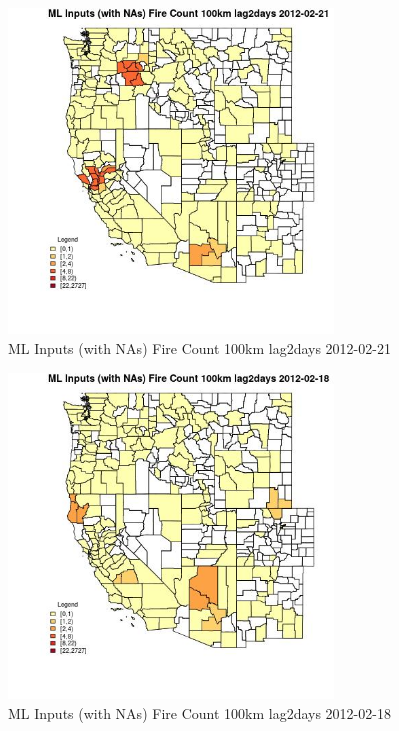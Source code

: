 \begin{figure} 
\centering  
\includegraphics[width=0.77\textwidth]{Code_Outputs/Report_ML_input_PM25_Step4_part_f_de_duplicated_aveswNAs_CountyFire_Count_100km_lag2daysMean2012-02-21.jpg} 
\caption{\label{fig:Report_ML_input_PM25_Step4_part_f_de_duplicated_aveswNAsCountyFire_Count_100km_lag2daysMean2012-02-21}ML Inputs (with NAs) Fire Count 100km lag2days 2012-02-21} 
\end{figure} 
 

\begin{figure} 
\centering  
\includegraphics[width=0.77\textwidth]{Code_Outputs/Report_ML_input_PM25_Step4_part_f_de_duplicated_aveswNAs_CountyFire_Count_100km_lag2daysMean2012-02-18.jpg} 
\caption{\label{fig:Report_ML_input_PM25_Step4_part_f_de_duplicated_aveswNAsCountyFire_Count_100km_lag2daysMean2012-02-18}ML Inputs (with NAs) Fire Count 100km lag2days 2012-02-18} 
\end{figure} 
 

